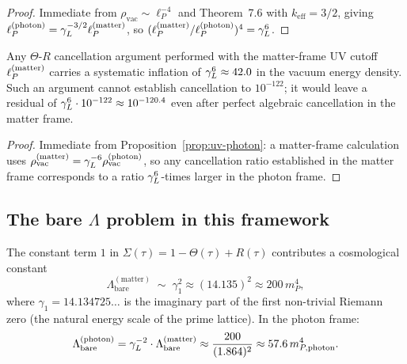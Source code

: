 \begin{proof}
Immediate from $\rho_{\mathrm{vac}} \sim \ell_P^{-4}$ and
Theorem~7.6 with $k_{\mathrm{eff}} = 3/2$, giving
$\ell_P^{(\mathrm{photon})} = \gamma_L^{-3/2}\ell_P^{(\mathrm{matter})}$,
so $(\ell_P^{(\mathrm{matter})}/\ell_P^{(\mathrm{photon})})^4 = \gamma_L^6$.
\end{proof}

\begin{corollary}
\label{cor:matter-error}
Any $\Theta$-$R$ cancellation argument performed with the matter-frame
UV cutoff $\ell_P^{(\mathrm{matter})}$ carries a systematic inflation of
$\gamma_L^6 \approx 42.0$ in the vacuum energy density. Such an argument
cannot establish cancellation to $10^{-122}$; it would leave a residual
of $\gamma_L^6 \cdot 10^{-122} \approx 10^{-120.4}$ even after perfect
algebraic cancellation in the matter frame.
\end{corollary}

\begin{proof}
Immediate from Proposition~\ref{prop:uv-photon}: a matter-frame
calculation uses $\rho_{\mathrm{vac}}^{(\mathrm{matter})}
= \gamma_L^{-6}\rho_{\mathrm{vac}}^{(\mathrm{photon})}$, so any
cancellation ratio established in the matter frame corresponds to a
ratio $\gamma_L^6$-times larger in the photon frame.
\end{proof}

\subsection{The bare $\Lambda$ problem in this framework}

\begin{proposition}
\label{prop:bare-lambda}
The constant term $1$ in $\Sigma(\tau) = 1 - \Theta(\tau) + R(\tau)$
contributes a cosmological constant
\[
  \Lambda_{\mathrm{bare}}^{(\mathrm{matter})}
  \;\sim\; \gamma_1^2 \approx (14.135)^2 \approx 200\,m_P^4,
\]
where $\gamma_1 = 14.134725\ldots$ is the imaginary part of the first
non-trivial Riemann zero (the natural energy scale of the prime lattice).
In the photon frame:
\[
  \Lambda_{\mathrm{bare}}^{(\mathrm{photon})}
  = \gamma_L^{-2}\cdot\Lambda_{\mathrm{bare}}^{(\mathrm{matter})}
  \approx \frac{200}{(1.864)^2} \approx 57.6\,m_{P,\mathrm{photon}}^4.
\]
\end{proposition}

